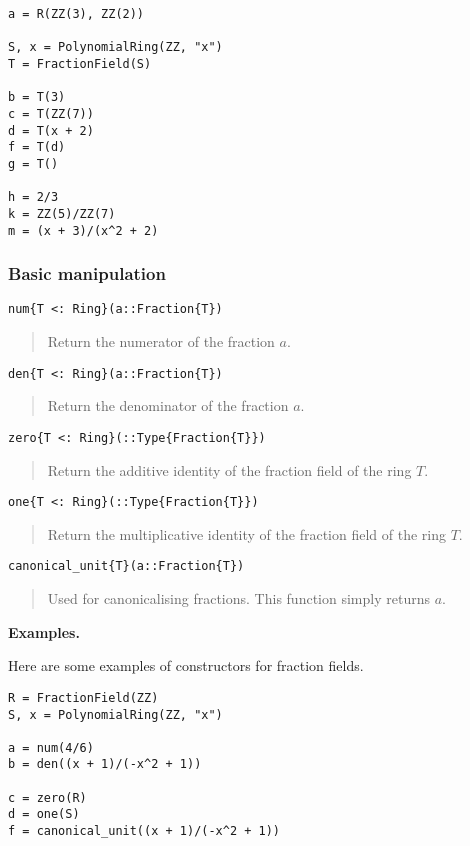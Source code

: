 \documentclass[a4paper,10pt]{article}
\newcommand{\desc}[1]{\vspace{-3mm}\begin{quote}#1\end{quote}}
\begin{document}
{{{\begin{lstlisting}
a = R(ZZ(3), ZZ(2))

S, x = PolynomialRing(ZZ, "x")
T = FractionField(S)

b = T(3)
c = T(ZZ(7))
d = T(x + 2)
f = T(d)
g = T()

h = 2/3
k = ZZ(5)/ZZ(7)
m = (x + 3)/(x^2 + 2)
\end{lstlisting}

\subsubsection{Basic manipulation}

\begin{lstlisting}
num{T <: Ring}(a::Fraction{T})
\end{lstlisting}

\desc{Return the numerator of the fraction $a$.}

\begin{lstlisting}
den{T <: Ring}(a::Fraction{T})
\end{lstlisting}

\desc{Return the denominator of the fraction $a$.}

\begin{lstlisting}
zero{T <: Ring}(::Type{Fraction{T}})
\end{lstlisting}

\desc{Return the additive identity of the fraction field of the ring $T$.}

\begin{lstlisting}
one{T <: Ring}(::Type{Fraction{T}})
\end{lstlisting}

\desc{Return the multiplicative identity of the fraction field of the ring 
$T$.}

\begin{lstlisting}
canonical_unit{T}(a::Fraction{T})
\end{lstlisting}

\desc{Used for canonicalising fractions. This function simply returns $a$.}

\textbf{Examples.}

Here are some examples of constructors for fraction fields.

\begin{lstlisting}
R = FractionField(ZZ)
S, x = PolynomialRing(ZZ, "x")

a = num(4/6)
b = den((x + 1)/(-x^2 + 1))

c = zero(R)
d = one(S)
f = canonical_unit((x + 1)/(-x^2 + 1))
\end{lstlisting}

}}}
\end{document}
